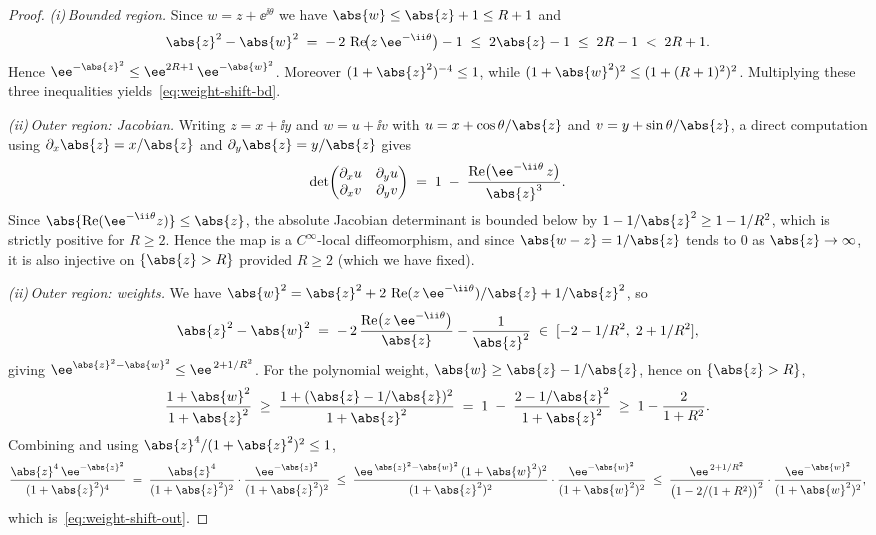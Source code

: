 \begin{proof}
\emph{(i)\,Bounded region.}\;
Since $w = z+\ee^{\ii\theta}$ we have $\abs{w}\le \abs{z}+1\le R+1$ and
\[
\abs{z}^{2} - \abs{w}^{2}
\;=\; -\,2\,\operatorname{Re}\!\bigl(z\,\ee^{-\ii\theta}\bigr) - 1
\;\le\; 2\abs{z} - 1
\;\le\; 2R - 1
\;<\; 2R + 1.
\]
Hence
$\ee^{-\abs{z}^{2}} \le \ee^{2R+1}\,\ee^{-\abs{w}^{2}}$. Moreover
$(1+\abs{z}^{2})^{-4} \le 1$, while $(1+\abs{w}^{2})^{2} \le
(1+(R+1)^{2})^{2}$. Multiplying these three inequalities
yields~\eqref{eq:weight-shift-bd}.

\medskip

\emph{(ii)\,Outer region: Jacobian.}\;
Writing $z = x+\ii y$ and $w = u + \ii v$ with $u = x +
\cos\theta/\abs{z}$ and $v = y + \sin\theta/\abs{z}$, a direct
computation using $\partial_{x}\abs{z} = x/\abs{z}$ and
$\partial_{y}\abs{z} = y/\abs{z}$ gives
\[
\det\!\begin{pmatrix} \partial_{x} u & \partial_{y} u \\
\partial_{x} v & \partial_{y} v \end{pmatrix}
\;=\;
1 \;-\; \frac{\operatorname{Re}\bigl(\ee^{-\ii\theta}\,z\bigr)}{\abs{z}^{3}}.
\]
Since $\abs{\operatorname{Re}(\ee^{-\ii\theta}z)} \le \abs{z}$, the
absolute Jacobian determinant is bounded below by
$1 - 1/\abs{z}^{2} \ge 1 - 1/R^{2}$, which is strictly positive for
$R\ge 2$.  Hence the map is a $C^{\infty}$-local diffeomorphism, and
since $\abs{w-z} = 1/\abs{z}$ tends to $0$ as $\abs{z}\to\infty$, it is
also injective on $\{\abs{z}>R\}$ provided $R \ge 2$ (which we have
fixed).

\medskip

\emph{(ii)\,Outer region: weights.}\;
We have $\abs{w}^{2} = \abs{z}^{2} +
2\,\operatorname{Re}(z\,\ee^{-\ii\theta})/\abs{z} + 1/\abs{z}^{2}$, so
\[
\abs{z}^{2} - \abs{w}^{2}
\;=\; -\,2\,\frac{\operatorname{Re}\bigl(z\,\ee^{-\ii\theta}\bigr)}{\abs{z}}
- \frac{1}{\abs{z}^{2}}
\;\in\; [-2 - 1/R^{2},\; 2 + 1/R^{2}],
\]
giving $\ee^{\abs{z}^{2}-\abs{w}^{2}} \le \ee^{\,2 + 1/R^{2}}$.
For the polynomial weight, $\abs{w}\ge \abs{z} - 1/\abs{z}$, hence on
$\{\abs{z} > R\}$,
\[
\frac{1+\abs{w}^{2}}{1+\abs{z}^{2}}
\;\ge\;
\frac{1+(\abs{z}-1/\abs{z})^{2}}{1+\abs{z}^{2}}
\;=\;
1 \;-\; \frac{2 - 1/\abs{z}^{2}}{1+\abs{z}^{2}}
\;\ge\;
1 - \frac{2}{1+R^{2}}.
\]
Combining and using $\abs{z}^{4}/(1+\abs{z}^{2})^{2} \le 1$,
\[
\frac{\abs{z}^{4}\,\ee^{-\abs{z}^{2}}}{(1+\abs{z}^{2})^{4}}
\;=\;
\frac{\abs{z}^{4}}{(1+\abs{z}^{2})^{2}}\cdot
\frac{\ee^{-\abs{z}^{2}}}{(1+\abs{z}^{2})^{2}}
\;\le\;
\frac{\ee^{\,\abs{z}^{2}-\abs{w}^{2}}\,(1+\abs{w}^{2})^{2}}
{(1+\abs{z}^{2})^{2}}\cdot
\frac{\ee^{-\abs{w}^{2}}}{(1+\abs{w}^{2})^{2}}
\;\le\;
\frac{\ee^{\,2 + 1/R^{2}}}{\bigl(1-2/(1+R^{2})\bigr)^{2}}\cdot
\frac{\ee^{-\abs{w}^{2}}}{(1+\abs{w}^{2})^{2}},
\]
which is~\eqref{eq:weight-shift-out}.
\end{proof}

